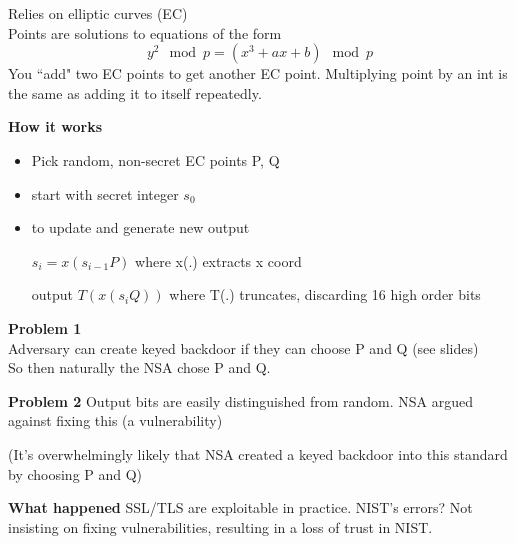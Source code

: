\begin{definition}
	Relies on elliptic curves (EC)\\
	Points are solutions to equations of the form 
	$$y^2 \mod p = (x^3 + ax + b) \mod p$$
	You ``add" two EC points to get another EC point. Multiplying point by an int is the same as adding it to itself repeatedly.
\end{definition}

\textbf{How it works}
\begin{itemize}
	\item Pick random, non-secret EC points P, Q
	\item start with secret integer $s_0$
	\item to update and generate new output

		\hspace*{1cm} $s_i = x(s_{i-1} P)$ \hspace{1cm} where x(.) extracts x coord 

		\hspace*{1cm} output $T(x(s_i Q))$ \hspace{1cm} where T(.) truncates, discarding 16 high order bits
\end{itemize}

\textbf{Problem 1}\\
Adversary can create keyed backdoor if they can choose P and Q (see slides)\\
So then naturally the NSA chose P and Q.



\textbf{Problem 2}
Output bits are easily distinguished from random.
NSA argued against fixing this (a vulnerability)

(It's overwhelmingly likely that NSA created a keyed backdoor into this standard by choosing P and Q)

\textbf{What happened}
SSL/TLS are exploitable in practice.
NIST's errors? Not insisting on fixing vulnerabilities, resulting in a loss of trust in NIST.


